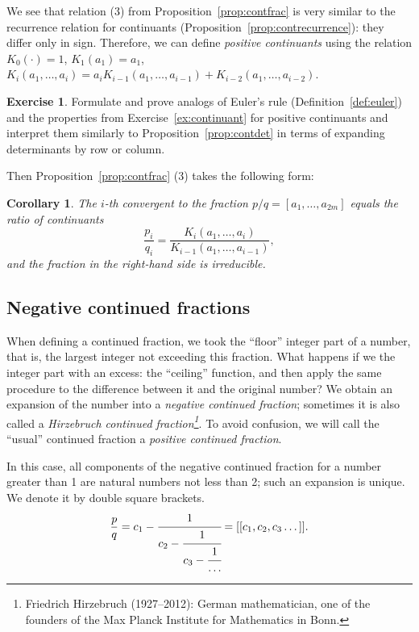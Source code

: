 \documentclass[a4paper,11pt]{amsart}
\theoremstyle{plain}
\newtheorem{corollary}[theorem]{Corollary}
\theoremstyle{remark}
\theoremstyle{definition}
\newtheorem{exercise}[theorem]{Exercise}
\numberwithin{equation}{section}
\numberwithin{figure}{section}
\begin{document}
We see that relation (3) from Proposition~\ref{prop:contfrac} is very similar to the recurrence relation for continuants (Proposition~\ref{prop:contrecurrence}): they differ only in sign. Therefore, we can define \emph{positive continuants} using the relation $K_0(\cdot) = 1$, $K_1(a_1) = a_1$, $K_i(a_1, \dots, a_i) = a_i K_{i-1}(a_1, \dots, a_{i-1}) + K_{i-2}(a_1, \dots, a_{i-2})$.

\begin{exercise} Formulate and prove analogs of Euler's rule (Definition~\ref{def:euler}) and the properties from Exercise~\ref{ex:continuant} for positive continuants and interpret them similarly to Proposition~\ref{prop:contdet} in terms of expanding determinants by row or column.
\end{exercise}

Then Proposition~\ref{prop:contfrac} (3) takes the following form:
\begin{corollary}
The $i$-th convergent to the fraction $p/q = [a_1, \dots, a_{2m}]$ equals the ratio of continuants
\[
\frac{p_i}{q_i} = \frac{K_i(a_1, \dots, a_i)}{K_{i-1}(a_1, \dots, a_{i-1})},
\]
and the fraction in the right-hand side is irreducible.
\end{corollary}

\subsection{Negative continued fractions}

When defining a continued fraction, we took the ``floor'' integer part of a number, that is, the largest integer not exceeding this fraction. What happens if we the integer part with an excess: the ``ceiling'' function,  and then apply the same procedure to the difference between it and the original number? We obtain an expansion of the number into a \emph{negative continued fraction}; sometimes it is also called a \emph{Hirzebruch continued fraction\footnote{Friedrich Hirzebruch (1927--2012): German mathematician, one of the founders of the Max Planck Institute for Mathematics in Bonn.}}. To avoid confusion, we will call the ``usual'' continued fraction a \emph{positive continued fraction}.

In this case, all components of the negative continued fraction for a number greater than 1 are natural numbers not less than 2; such an expansion is  unique. We denote it by double square brackets.
\[
\frac{p}{q} = c_1 - \cfrac{1}{c_2 - \cfrac{1}{c_3 - \cfrac{1}{\dots}}} = [[c_1, c_2, c_3 \dots]].
\]
\end{document}
